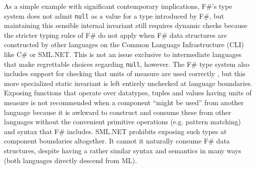 As a simple example with significant contemporary implications, F\#'s type system does not admit \verb|null| as a value for a type introduced by F\#, but maintaining this sensible internal invariant still requires dynamic  checks because the stricter typing rules of F\# do not apply when F\# data structures are constructed by other languages on the Common Language Infrastructure (CLI) like C\# or SML.NET. This is not an issue exclusive to intermediate languages that make regrettable choices regarding \verb|null|, however. The F\# type system also includes support for checking that units of measure are used correctly \cite{syme2012expert, kennedy1994dimension}, but this more specialized static invariant is left entirely unchecked at language boundaries. Exposing functions that operate over datatypes, tuples and values having units of measure is not recommended when a component ``might be used'' from another language \cite{syme2012expert} because it is awkward to construct and consume these from other languages without the convenient primitive operations (e.g. pattern matching) and syntax that F\# includes. SML.NET prohibits exposing such types at component boundaries altogether. It cannot it naturally consume F\# data structures, despite having a rather similar syntax and semantics in many ways (both languages directly descend from ML). 

